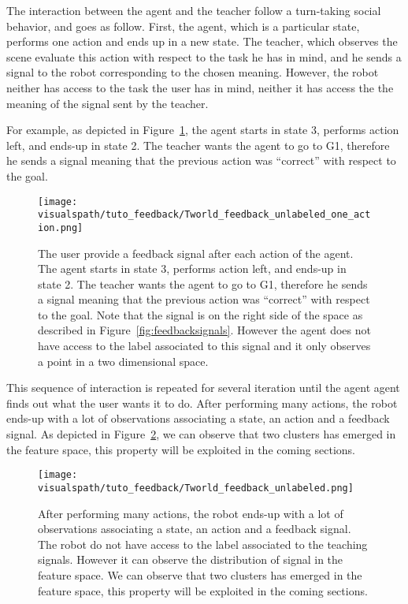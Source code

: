 The interaction between the agent and the teacher follow a turn-taking social behavior, and goes as follow. First, the agent, which is a particular state, performs one action and ends up in a new state. The teacher, which observes the scene evaluate this action with respect to the task he has in mind, and he sends a signal to the robot corresponding to the chosen meaning. However, the robot neither has access to the task the user has in mind, neither it has access the the meaning of the signal sent by the teacher.

For example, as depicted in Figure~\ref{fig:TworldOneStepUnlabeled}, the agent starts in state 3, performs action left, and ends-up in state 2. The teacher wants the agent to go to G1, therefore he sends a signal meaning that the previous action was ``correct'' with respect to the goal.

\begin{figure}[!ht]
  \centering
  \texttt{[image: \\visualspath/tuto\_feedback/Tworld\_feedback\_unlabeled\_one\_action.png]}
  \caption{The user provide a feedback signal after each action of the agent. The agent starts in state 3, performs action left, and ends-up in state 2. The teacher wants the agent to go to G1, therefore he sends a signal meaning that the previous action was ``correct'' with respect to the goal. Note that the signal is on the right side of the space as described in Figure~\ref{fig:feedbacksignals}. However the agent does not have access to the label associated to this signal and it only observes a point in a two dimensional space.}
  \label{fig:TworldOneStepUnlabeled}
\end{figure}

This sequence of interaction is repeated for several iteration until the agent agent finds out what the user wants it to do. After performing many actions, the robot ends-up with a lot of observations associating a state, an action and a feedback signal. As depicted in Figure~\ref{fig:TworldManyStepUnlabeled}, we can observe that two clusters has emerged in the feature space, this property will be exploited in the coming sections.

\begin{figure}[!ht]
  \centering
  \texttt{[image: \\visualspath/tuto\_feedback/Tworld\_feedback\_unlabeled.png]}
  \caption{After performing many actions, the robot ends-up with a lot of observations associating a state, an action and a feedback signal. The robot do not have access to the label associated to the teaching signals. However it can observe the distribution of signal in the feature space. We can observe that two clusters has emerged in the feature space, this property will be exploited in the coming sections.}
  \label{fig:TworldManyStepUnlabeled}
\end{figure}

